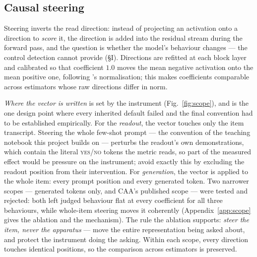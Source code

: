 \documentclass[conference]{IEEEtran}
\begin{document}
\subsection{Causal steering}
\label{sec:steering}

Steering inverts the read direction: instead of projecting an activation onto a
direction to \emph{score} it, the direction is added into the residual stream
during the forward pass, and the question is whether the model's behaviour
changes --- the control detection cannot provide (§I).
Directions are refitted at each block layer and calibrated
so that coefficient $1.0$ moves the mean negative activation onto the mean
positive one, following \citeauthor{marks2024}'s normalisation; this makes
coefficients comparable across estimators whose raw directions differ in norm.

\emph{Where the vector is written} is set by the instrument
(Fig.~\ref{fig:scope}), and is the one design point where every inherited
default failed and the final convention had to be established empirically. For
the \emph{readout}, the vector touches only the item transcript. Steering the
whole few-shot prompt --- the convention of the teaching notebook this project
builds on \citep{arena2024} --- perturbs the readout's own demonstrations, which
contain the literal \textsc{yes}/\textsc{no} tokens the metric reads, so part of
the measured effect would be pressure on the instrument;
\citet{marks2024} avoid exactly this by excluding the readout position from
their intervention. For \emph{generation}, the vector is applied to the whole
item: every prompt position and every generated token. Two narrower scopes ---
generated tokens only, and CAA's published scope \citep{rimsky2024} --- were
tested and rejected: both left judged behaviour flat at every coefficient for
all three behaviours, while whole-item steering moves it coherently
(Appendix~\ref{app:scope} gives the ablation and the mechanism). The rule the
ablation supports: \emph{steer the item, never the apparatus} --- move the
entire representation being asked about, and protect the instrument doing the
asking. Within each scope, every direction touches identical positions, so the
comparison across estimators is preserved.
\end{document}
